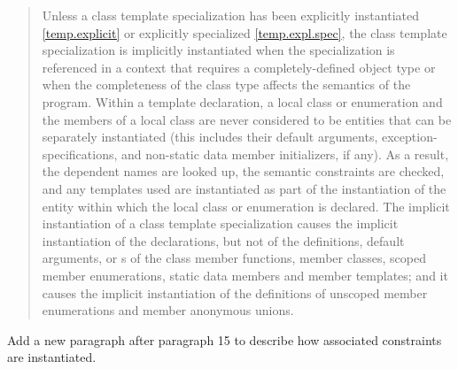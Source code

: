 \begin{quote}
Unless a class template specialization has been explicitly
instantiated \ref{temp.explicit} or explicitly specialized \ref{temp.expl.spec}, 
the class template specialization is implicitly instantiated when the
specialization is referenced in a context that requires a
completely-defined object type or when the completeness of the
class type affects the semantics of the program. 
% 
\enternote
Within a template declaration, a local class or enumeration and the members
of a local class are never considered to be entities that can be
separately instantiated (this includes their default arguments,
exception-specifications, and non-static data member initializers, if any). 
% 
As a result, the dependent names are looked up, the semantic constraints 
are checked, and any templates used are instantiated as part of the
instantiation of the entity within which the local class or enumeration is 
declared.
\exitnote
% 
The implicit instantiation of a class template specialization causes the 
implicit instantiation of the declarations, but not of the definitions, default
arguments,  or
s of the class member functions,
member classes, scoped member enumerations, static data members and
member templates; and it causes the implicit instantiation of the
definitions of unscoped member enumerations and member anonymous
unions.
\end{quote}


Add a new paragraph after paragraph 15 to describe how associated
constraints are instantiated.

